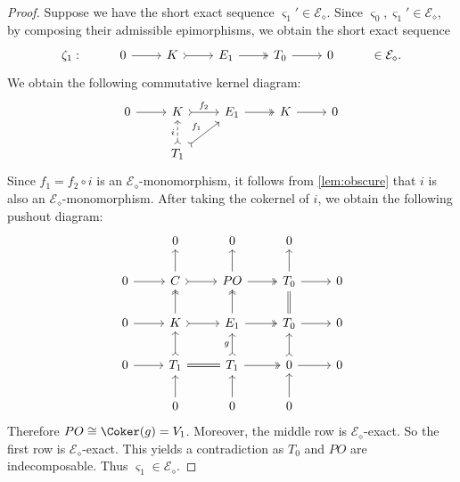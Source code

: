 \begin{proof}
Suppose we have the short exact sequence $\varsigma_1' \in \mathcal{E}_\diamond$. Since $\varsigma_0, \varsigma_1' \in \mathcal{E}_\diamond$, by composing their admissible epimorphisms, we obtain the short exact sequence  \[\begin{tikzcd}
	\zeta_1: & 0 & K & E_1 & T_0 &  0 & \in \mathcal{E}_\diamond.
	\arrow[from=1-2, to=1-3]
	\arrow[tail, from=1-3, to=1-4]
	\arrow[two heads,from=1-4, to=1-5]
	\arrow[from=1-5, to=1-6]
\end{tikzcd}\]  We obtain the following commutative kernel diagram:
\[\begin{tikzcd}
	 0 & K & E_1 & K &  0 \\
      & T_1 & & &
	\arrow[from=1-1, to=1-2]
	\arrow[tail,"f_2", from=1-2, to=1-3] 
        \arrow[tail,"f_1",from=2-2, to=1-3]
        \arrow[tail,dashed,"i",from=2-2, to=1-2]
	\arrow[two heads,from=1-3, to=1-4]
	\arrow[from=1-4, to=1-5]
\end{tikzcd}\] 
Since $f_1 = f_2 \circ i$ is an $ \mathcal{E}_\diamond$-monomorphism, it follows from \cref{lem:obscure} that $i$ is also an $\mathcal{E}_\diamond$-monomorphism. After taking the cokernel of $i$, we obtain the following pushout diagram:
\[\begin{tikzcd}
         & 0 & 0 & 0 &  \\
	0 & C & PO  & T_0 &  0 \\
     0 & K & E_1 & T_0 & 0 \\
      0 & T_1 & T_1 & 0 & 0 \\
       & 0 & 0 & 0 & 
	\arrow[from=2-1, to=2-2]
	\arrow[tail, from=2-2, to=2-3]
	\arrow[two heads,from=2-3, to=2-4]
	\arrow[from=2-4, to=2-5]
        \arrow[from=3-1, to=3-2]
	\arrow[tail, from=3-2, to=3-3]
	\arrow[two heads,from=3-3, to=3-4]
	\arrow[from=3-4, to=3-5]
        \arrow[from=4-1, to=4-2]
	\arrow[equals, from=4-2, to=4-3]
	\arrow[two heads,from=4-3, to=4-4]
	\arrow[from=4-4, to=4-5]
        \arrow[from=5-2, to=4-2]
	\arrow[tail, from=4-2, to=3-2]
	\arrow[two heads,from=3-2, to=2-2]
	\arrow[from=2-2, to=1-2]
        \arrow[from=5-3, to=4-3]
	\arrow[tail,"g", from=4-3, to=3-3]
	\arrow[two heads,from=3-3, to=2-3]
	\arrow[from=2-3, to=1-3]
        \arrow[from=5-4, to=4-4]
	\arrow[tail, from=4-4, to=3-4]
	\arrow[equals,from=3-4, to=2-4]
	\arrow[from=2-4, to=1-4]
\end{tikzcd} \]
Therefore $PO \cong \Coker(g) = V_1 $. Moreover, the middle row is ${\mathcal{E}_\diamond}$-exact. So the first row is ${\mathcal{E}_\diamond}$-exact. This yields a contradiction as $T_0$ and $PO$ are indecomposable. Thus $\varsigma_1 \in \mathcal{E}_\diamond$.


\end{proof}

